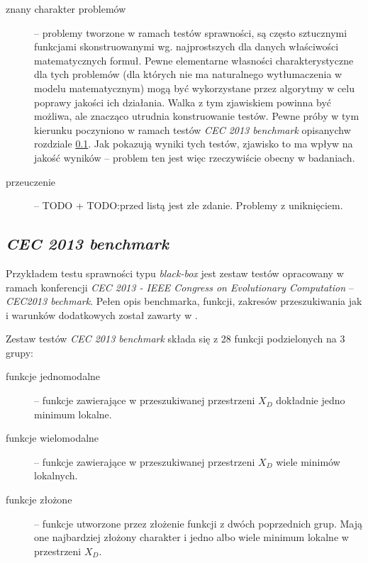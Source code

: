\documentclass[12pt,a4paper]{report}
\begin{document}
{{{{{\begin{description}
\item[znany charakter problemów] -- problemy tworzone w ramach testów sprawności, są często sztucznymi funkcjami skonstruowanymi wg. najprostszych dla danych właściwości matematycznych formuł. Pewne elementarne własności charakterystyczne dla tych problemów (dla których nie ma naturalnego wytłumaczenia w modelu matematycznym) mogą być wykorzystane przez algorytmy w celu poprawy jakości ich działania. Walka z tym zjawiskiem powinna być możliwa, ale znacząco utrudnia konstruowanie testów. Pewne próby w tym kierunku poczyniono w ramach testów \emph{CEC 2013 benchmark} opisanychw rozdziale \ref{CEC2013chapter}. Jak pokazują wyniki tych testów, zjawisko to ma wpływ na jakość wyników -- problem ten jest więc rzeczywiście obecny w badaniach.
\item[przeuczenie] -- TODO + TODO:przed listą jest złe zdanie. Problemy z uniknięciem.
\end{description}
}
\subsection{\emph{CEC 2013 benchmark}}
\label{CEC2013chapter}
\par{
Przykładem testu sprawności typu \emph{black-box} jest zestaw testów opracowany w ramach konferencji \emph{CEC 2013 - IEEE Congress on Evolutionary Computation} -- \emph{CEC2013 bechmark}. Pełen opis benchmarka, funkcji, zakresów przeszukiwania jak i warunków dodatkowych został zawarty w \cite{Li13benchmarkfunctions}.
}
\par{
Zestaw testów \emph{CEC 2013 benchmark} składa się z 28 funkcji podzielonych na 3 grupy:
\begin{description}
\item[funkcje jednomodalne] -- funkcje zawierające w przeszukiwanej przestrzeni $X_D$ dokładnie jedno minimum lokalne.
\item[funkcje wielomodalne] -- funkcje zawierające w przeszukiwanej przestrzeni $X_D$ wiele minimów lokalnych.
\item[funkcje złożone] -- funkcje utworzone przez złożenie funkcji z dwóch poprzednich grup. Mają one najbardziej złożony charakter i jedno albo wiele minimum lokalne w przestrzeni $X_D$.
\end{description}

}}}}}
\end{document}
